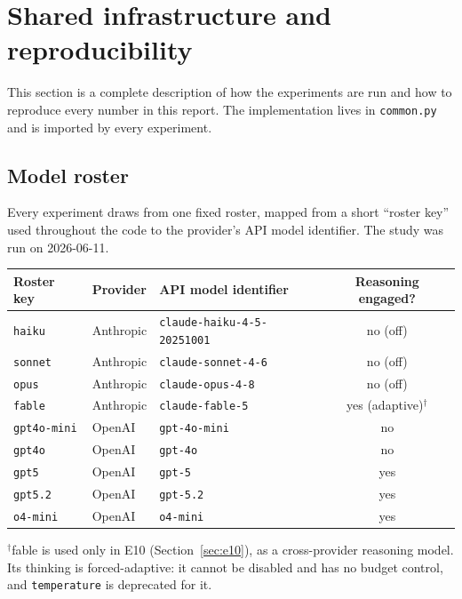 \documentclass[11pt]{article}
\newcommand{\code}[1]{\texttt{\small #1}}
\begin{document}
\section{Shared infrastructure and reproducibility}
\label{sec:infra}

This section is a complete description of how the experiments are run and how to reproduce
every number in this report. The implementation lives in \code{common.py} and is imported by
every experiment.

\subsection{Model roster}
\label{sec:roster}

Every experiment draws from one fixed roster, mapped from a short ``roster key'' used
throughout the code to the provider's API model identifier. The study was run on 2026-06-11.

\begin{center}
\begin{tabular}{@{}lllc@{}}
\toprule
Roster key & Provider & API model identifier & Reasoning engaged? \\
\midrule
\code{haiku}      & Anthropic & \code{claude-haiku-4-5-20251001} & no (off) \\
\code{sonnet}     & Anthropic & \code{claude-sonnet-4-6}         & no (off) \\
\code{opus}       & Anthropic & \code{claude-opus-4-8}           & no (off) \\
\code{fable}      & Anthropic & \code{claude-fable-5}            & yes (adaptive)$^\dagger$ \\
\code{gpt4o-mini} & OpenAI    & \code{gpt-4o-mini}               & no \\
\code{gpt4o}      & OpenAI    & \code{gpt-4o}                    & no \\
\code{gpt5}       & OpenAI    & \code{gpt-5}                     & yes \\
\code{gpt5.2}     & OpenAI    & \code{gpt-5.2}                   & yes \\
\code{o4-mini}    & OpenAI    & \code{o4-mini}                   & yes \\
\bottomrule
\end{tabular}
\end{center}
{\footnotesize $^\dagger$fable is used only in E10 (Section~\ref{sec:e10}), as a cross-provider
reasoning model. Its thinking is forced-adaptive: it cannot be disabled and has no budget
control, and \code{temperature} is deprecated for it.}
\end{document}
